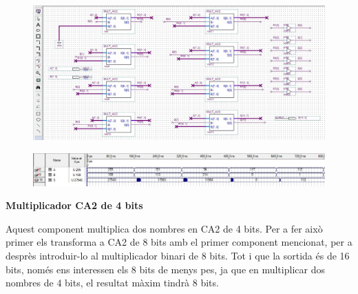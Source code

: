 \documentclass[12pt, a4papre]{article}
\begin{document}
	\begin{center}
	\begin{figure}[H]
		\begin{center}
		\includegraphics[width=150mm]{multbin8bits.jpeg}
		\end{center}
	\end{figure}
	
	\end{center}
	
	\begin{center}
	\begin{figure}[H]
		\begin{center}
		\includegraphics[width=150mm]{multbin8bitssimul.jpeg}
		\end{center}
	\end{figure}
	
	\end{center}
	
	
	
	
	\textbf{\large{Multiplicador CA2 de 4 bits}}
	
	Aquest component multiplica dos nombres en CA2 de 4 bits. Per a fer això primer els transforma a CA2 de 8 bits amb el primer component mencionat, per a desprès introduir-lo al multiplicador binari de 8 bits. Tot i que la sortida és de 16 bits, només ens interessen els 8 bits de menys pes, ja que en multiplicar dos nombres de 4 bits, el resultat màxim tindrà 8 bits.
	
\end{document}
